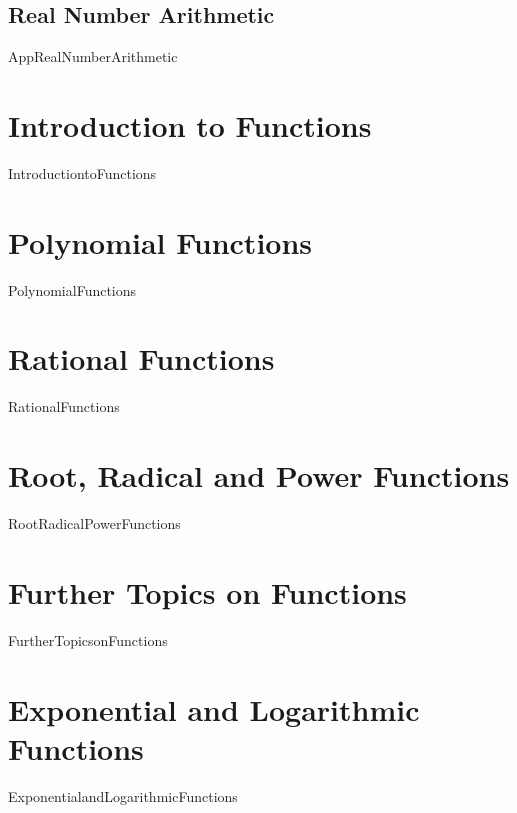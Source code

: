 \documentclass[11pt]{book}
\theoremstyle{definition}  %
\begin{document}
\section{Real Number Arithmetic}
{AppRealNumberArithmetic}

\chapter{Introduction to Functions}
\label{IntroductiontoFunctions}
\thispagestyle{empty}
{IntroductiontoFunctions}

\chapter{Polynomial Functions}
\label{PolynomialFunctions}
\thispagestyle{empty}
{PolynomialFunctions}

\chapter{Rational Functions}
\label{RationalFunctions}
\thispagestyle{empty}
{RationalFunctions}


\chapter{Root, Radical and Power Functions}
\label{RootRadicalPowerFunctions}
\thispagestyle{empty}
{RootRadicalPowerFunctions}

\chapter{Further Topics on Functions}
\label{FurtherTopicsonFunctions}
\thispagestyle{empty}
{FurtherTopicsonFunctions}

\chapter{Exponential and Logarithmic Functions}
\label{ExponentialandLogarithmicFunctions}
\thispagestyle{empty}
{ExponentialandLogarithmicFunctions}

\end{document}
